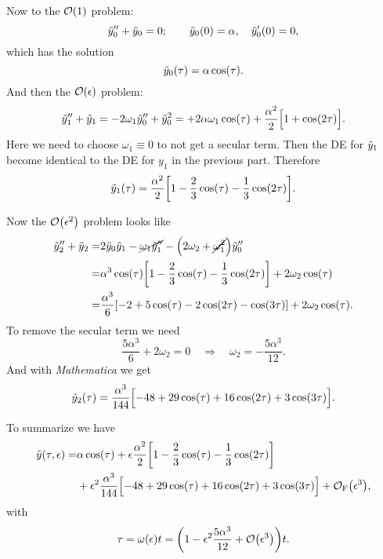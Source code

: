 \documentclass[11pt,letter, swedish, english
]{article}
\begin{document}
Now to the $\order{1}$ problem:
\begin{equation}
\tilde{y}_0''+\tilde{y}_0=0;\qquad
\tilde{y}_0(0)=\alpha,\quad {\ensuremath{\tilde{y}}_0'}(0)=0,
\end{equation}
which has the solution
\begin{equation}
\tilde{y}_0(\tau)=\alpha\cos(\tau).
\end{equation}
And then the $\order{\epsilon}$ problem:
\begin{equation}
\tilde{y}_1''+\tilde{y}_1=-2\omega_1\tilde{y}_0''+\tilde{y}_0^2
=+2\alpha\omega_1\cos(\tau)
+\frac{\alpha^2}{2}\Big[1+\cos(2\tau)\Big].
\end{equation}
Here we need to choose $\omega_1\equiv0$ to not get a secular
term. Then the DE for $\tilde{y}_1$ become identical to the DE for $y_1$ in
the previous part. Therefore
\begin{equation}
\tilde{y}_1(\tau)=\frac{\alpha^2}{2}
\qty[1-\frac{2}{3}\cos(\tau)-\frac{1}{3}\cos(2\tau)].
\end{equation}

Now the $\order{\epsilon^2}$ problem looks like
\begin{equation}
\begin{aligned}
\tilde{y}_2''+\tilde{y}_2=&2\tilde{y}_0\tilde{y}_1-\cancel{\omega_1\tilde{y}_1''}-\qty(2\omega_2+\cancel{\omega_1^2})\tilde{y}_0''\\
=&\alpha^3\cos(\tau)\qty[1-\frac{2}{3}\cos(\tau)-\frac{1}{3}\cos(2\tau)]+2\omega_2\cos(\tau)
\\=&\frac{\alpha^3}{6}\qty[-2+5\cos(\tau)-2\cos(2\tau)-\cos(3\tau)]+2\omega_2\cos(\tau).
\end{aligned}
\end{equation}
To remove the secular term we need
\begin{equation}
\frac{5\alpha^3}{6}+2\omega_2=0
\quad\Longrightarrow\quad
\omega_2=-\frac{5\alpha^3}{12}.
\end{equation}
And with \textit{Mathematica} we get
\begin{equation}
\tilde{y}_2(\tau)=\frac{\alpha^3}{144}
\qty[-48+29\cos(\tau)+16\cos(2\tau)+3\cos(3\tau)\Big.].
\end{equation}

To summarize we have
\begin{equation}\label{eq:4b_y}
\begin{aligned}
\tilde{y}(\tau, \epsilon)=&\alpha\cos(\tau)+\epsilon\frac{\alpha^2}{2}
\qty[1-\frac{2}{3}\cos(\tau)-\frac{1}{3}\cos(2\tau)]\\
&+\epsilon^2\frac{\alpha^3}{144}
\qty[-48+29\cos(\tau)+16\cos(2\tau)+3\cos(3\tau)\Big.]
+\mathcal{O}_\text{F}\qty(\epsilon^3),
\end{aligned}
\end{equation}
with
\begin{equation}\label{eq:4b_t}
\tau=\omega(\epsilon)t=\qty(1-\epsilon^2\frac{5\alpha^3}{12}+\order{\epsilon^3})t.
\end{equation}
\end{document}
